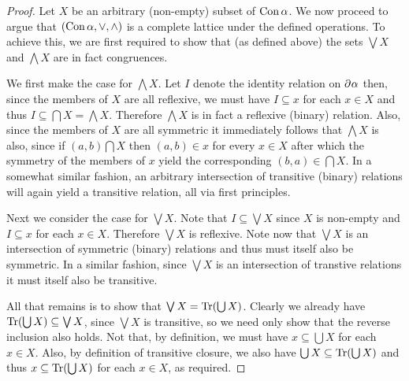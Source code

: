 \begin{proof}
	Let $X$ be an arbitrary (non-empty) subset of $\operatorname{Con}\alpha$.  We now proceed to argue that $(\operatorname{Con}\alpha,\vee,\wedge)$ is a complete lattice under the defined operations.  To achieve this, we are first required to show that (as defined above) the sets $\bigvee X$ and $\bigwedge X$ are in fact congruences.

	We first make the case for $\bigwedge X$.  Let $I$ denote the identity relation on $\partial^{}\alpha$ then, since the members of $X$ are all reflexive, we must have $I\subseteq x$ for each $x\in X$ and thus $I\subseteq\bigcap X=\bigwedge X$.  Therefore $\bigwedge X$ is in fact a reflexive (binary) relation.  Also, since the members of $X$ are all symmetric it immediately follows that $\bigwedge X$ is also, since if $(a,b)\bigcap X$ then $(a,b)\in x$ for every $x\in X$ after which the symmetry of the members of $x$ yield the corresponding $(b,a)\in\bigcap X$.  In a somewhat similar fashion, an arbitrary intersection of transitive (binary) relations will again yield a transitive relation, all via first principles.

	Next we consider the case for $\bigvee X$.  Note that $I\subseteq \bigvee X$ since $X$ is non-empty and $I\subseteq x$ for each $x\in X$.  Therefore $\bigvee X$ is reflexive.  Note now that $\bigvee X$ is an intersection of symmetric (binary) relations and thus must itself also be symmetric.  In a similar fashion, since $\bigvee X$ is an intersection of transtive relations it must itself also be transitive.

	All that remains is to show that $\bigvee X=\operatorname{Tr}(\bigcup X)$.  Clearly we already have $\operatorname{Tr}(\bigcup X)\subseteq\bigvee X$, since $\bigvee X$ is transitive,  so we need only show that the reverse inclusion also holds.  Not that, by definition, we must have $x\subseteq\bigcup X$ for each $x\in X$.  Also, by definition of transitive closure, we also have $\bigcup X\subseteq \operatorname{Tr}(\bigcup X)$ and thus $x\subseteq\operatorname{Tr}(\bigcup X)$ for each $x\in X$, as required.
\end{proof}

